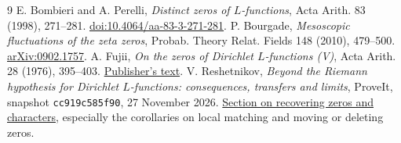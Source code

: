 \documentclass[11pt]{article}
\begin{document}
\begin{thebibliography}{9}
 E. Bombieri and A. Perelli, \emph{Distinct zeros of $L$-functions},
Acta Arith. 83 (1998), 271--281.
\href{https://doi.org/10.4064/aa-83-3-271-281}{doi:10.4064/aa-83-3-271-281}.
 P. Bourgade, \emph{Mesoscopic fluctuations of the zeta zeros},
Probab. Theory Relat. Fields 148 (2010), 479--500.
\href{https://arxiv.org/abs/0902.1757}{arXiv:0902.1757}.
 A. Fujii, \emph{On the zeros of Dirichlet $L$-functions (V)},
Acta Arith. 28 (1976), 395--403.
\href{https://matwbn.icm.edu.pl/ksiazki/aa/aa28/aa2847.pdf}{Publisher's text}.
 V. Reshetnikov, \emph{Beyond the Riemann hypothesis for Dirichlet
$L$-functions: consequences, transfers and limits}, ProveIt, snapshot
\texttt{cc919c585f90}, 27 November 2026.
\href{https://github.com/VladimirReshetnikov/ProveIt/blob/cc919c585f90be8e0fba7a1b90c70afdea39998e/Analysis/GeneralizedRiemannHypothesis/Article/sections/rec.tex}{Section on recovering zeros and characters},
especially the corollaries on local matching and moving or deleting zeros.
\end{thebibliography}
\end{document}
